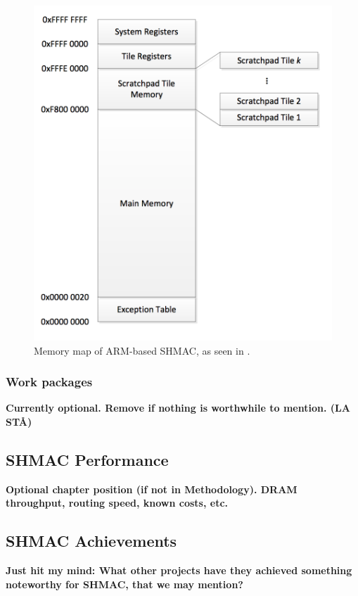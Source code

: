 \begin{figure}[htb]
    \centering
    \includegraphics[width=1.0\textwidth]{Figures/Heterogeneous/SHMACMemory}
    \caption{Memory map of ARM-based SHMAC, as seen in \cite{shmac-plan}.}
    \label{fig:shmac-memory}
\end{figure}


\subsubsection{Work packages}
\textbf{Currently optional. Remove if nothing is worthwhile to mention. (LA STÅ)}

\subsection{SHMAC Performance}
\textbf{Optional chapter position (if not in Methodology). DRAM throughput, routing speed, known costs, etc.}

\subsection{SHMAC Achievements}
\textbf{Just hit my mind: What other projects have they achieved something noteworthy for SHMAC, that we may mention?}